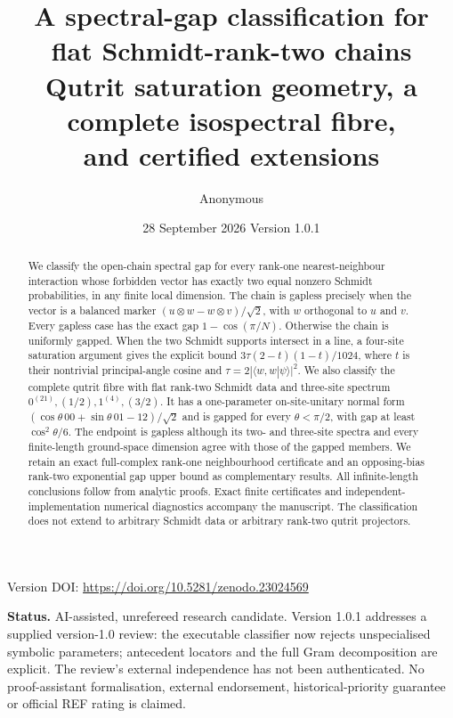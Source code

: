 \documentclass[11pt,a4paper]{article}
\title{\textbf{A spectral-gap classification for\\flat Schmidt-rank-two chains}\\[5pt]
\large Qutrit saturation geometry, a complete isospectral fibre,\\and certified extensions}
\author{Anonymous}
\date{28 September 2026 \quad Version 1.0.1}
\theoremstyle{remark}\newtheorem{remark}[theorem]{Remark}
\begin{document}
\maketitle
\begin{center}\small Version DOI: \url{https://doi.org/10.5281/zenodo.23024569}\end{center}
\begin{abstract}
We classify the open-chain spectral gap for every rank-one nearest-neighbour interaction whose forbidden vector has exactly two equal nonzero Schmidt probabilities, in any finite local dimension. The chain is gapless precisely when the vector is a balanced marker $(u\otimes w-w\otimes v)/\sqrt2$, with $w$ orthogonal to $u$ and $v$. Every gapless case has the exact gap $1-\cos(\pi/N)$. Otherwise the chain is uniformly gapped. When the two Schmidt supports intersect in a line, a four-site saturation argument gives the explicit bound $3\tau(2-t)(1-t)/1024$, where $t$ is their nontrivial principal-angle cosine and $\tau=2|\langle w,w|\psi\rangle|^2$. We also classify the complete qutrit fibre with flat rank-two Schmidt data and three-site spectrum $0^{(21)},(1/2),1^{(4)},(3/2)$. It has a one-parameter on-site-unitary normal form $(\cos\theta\,00+\sin\theta\,01-12)/\sqrt2$ and is gapped for every $\theta<\pi/2$, with gap at least $\cos^2\theta/6$. The endpoint is gapless although its two- and three-site spectra and every finite-length ground-space dimension agree with those of the gapped members. We retain an exact full-complex rank-one neighbourhood certificate and an opposing-bias rank-two exponential gap upper bound as complementary results. All infinite-length conclusions follow from analytic proofs. Exact finite certificates and independent-implementation numerical diagnostics accompany the manuscript. The classification does not extend to arbitrary Schmidt data or arbitrary rank-two qutrit projectors.
\end{abstract}
\noindent\textbf{Status.} AI-assisted, unrefereed research candidate. Version 1.0.1 addresses a supplied version-1.0 review: the executable classifier now rejects unspecialised symbolic parameters; antecedent locators and the full Gram decomposition are explicit. The review's external independence has not been authenticated. No proof-assistant formalisation, external endorsement, historical-priority guarantee or official REF rating is claimed.
\end{document}
